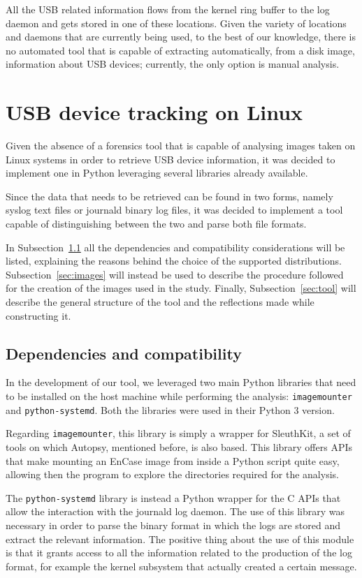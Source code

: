 \documentclass[a4paper]{article}
\begin{document}
All the USB related information flows from the kernel ring buffer to the log
daemon and gets stored in one of these locations. Given the variety of locations
and daemons that are currently being used, to the best of our knowledge, there
is no automated tool that is capable of extracting automatically, from a disk
image, information about USB devices; currently, the only option is manual
analysis.

\section{USB device tracking on Linux}
\label{sec:contrib}
Given the absence of a forensics tool that is capable of analysing images taken
on Linux systems in order to retrieve USB device information, it was decided to
implement one in Python leveraging several libraries already available.

Since the data that needs to be retrieved can be found in two forms, namely
syslog text files or journald binary log files, it was decided to implement a
tool capable of distinguishing between the two and parse both file formats.

In Subsection~\ref{sec:prems} all the dependencies and compatibility
considerations will be listed, explaining the reasons behind the choice of the
supported distributions. Subsection~\ref{sec:images} will instead be used to
describe the procedure followed for the creation of the images used in the
study. Finally, Subsection~\ref{sec:tool} will describe the general structure of
the tool and the reflections made while constructing it.

\subsection{Dependencies and compatibility}
\label{sec:prems}
In the development of our tool, we leveraged two main Python libraries that need
to be installed on the host machine while performing the analysis:
\texttt{imagemounter} and \texttt{python-systemd}. Both the libraries were used
in their Python 3 version.

Regarding \texttt{imagemounter}, this library is simply a wrapper for
SleuthKit, a set of tools on which Autopsy, mentioned before, is also based.
This library offers APIs that make mounting an EnCase image from inside a Python
script quite easy, allowing then the program to explore the directories required
for the analysis.

The \texttt{python-systemd} library is instead a Python wrapper for the C APIs
that allow the interaction with the journald log daemon. The use of this library
was necessary in order to parse the binary format in which the logs are stored
and extract the relevant information. The positive thing about the use of this
module is that it grants access to all the information related to the production
of the log format, for example the kernel subsystem that actually created a
certain message.
\end{document}
